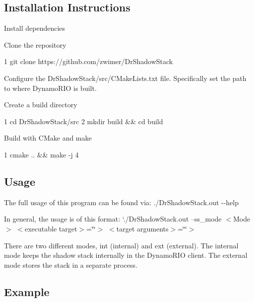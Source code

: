 \subsection*{Installation Instructions}


\begin{DoxyEnumerate}
\item Install dependencies
\item Clone the repository 
\begin{DoxyCode}
1 git clone https://github.com/zwimer/DrShadowStack
\end{DoxyCode}

\item Configure the {\ttfamily Dr\+Shadow\+Stack/src/\+C\+Make\+Lists.\+txt} file. Specifically set the path to where Dynamo\+R\+IO is built.
\item Create a build directory 
\begin{DoxyCode}
1 cd DrShadowStack/src
2 mkdir build && cd build
\end{DoxyCode}

\item Build with C\+Make and make 
\begin{DoxyCode}
1 cmake .. && make -j 4
\end{DoxyCode}

\end{DoxyEnumerate}

\subsection*{Usage}

The full usage of this program can be found via\+: {\ttfamily ./\+Dr\+Shadow\+Stack.out -\/-\/help}

In general, the usage is of this format\+: `./\+Dr\+Shadow\+Stack.out --ss\+\_\+mode $<$\+Mode$>$ $<$executable target$>$=\char`\"{}\char`\"{}$>$ $<$target arguments$>$=\char`\"{}\char`\"{}$>$

There are two different modes, {\ttfamily int} (internal) and {\ttfamily ext} (external). The internal mode keeps the shadow stack internally in the Dynamo\+R\+IO client. The external mode stores the stack in a separate process.

\subsection*{Example}

